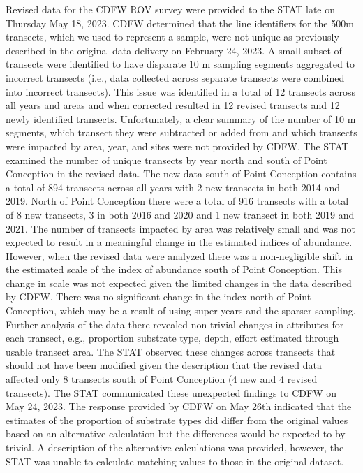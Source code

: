 \documentclass[11pt,
  english,
  letterpaper,
]{article}
\begin{document}
Revised data for the CDFW ROV survey were provided to the STAT late on Thursday May 18, 2023. CDFW determined that the line identifiers for the 500m transects, which we used to represent a sample, were not unique as previously described in the original data delivery on February 24, 2023. A small subset of transects were identified to have disparate 10 m sampling segments aggregated to incorrect transects (i.e., data collected across separate transects were combined into incorrect transects). This issue was identified in a total of 12 transects across all years and areas and when corrected resulted in 12 revised transects and 12 newly identified transects. Unfortunately, a clear summary of the number of 10 m segments, which transect they were subtracted or added from and which transects were impacted by area, year, and sites were not provided by CDFW. The STAT examined the number of unique transects by year north and south of Point Conception in the revised data. The new data south of Point Conception contains a total of 894 transects across all years with 2 new transects in both 2014 and 2019. North of Point Conception there were a total of 916 transects with a total of 8 new transects, 3 in both 2016 and 2020 and 1 new transect in both 2019 and 2021. The number of transects impacted by area was relatively small and was not expected to result in a meaningful change in the estimated indices of abundance. However, when the revised data were analyzed there was a non-negligible shift in the estimated scale of the index of abundance south of Point Conception. This change in scale was not expected given the limited changes in the data described by CDFW. There was no significant change in the index north of Point Conception, which may be a result of using super-years and the sparser sampling. Further analysis of the data there revealed non-trivial changes in attributes for each transect, e.g., proportion substrate type, depth, effort estimated through usable transect area. The STAT observed these changes across transects that should not have been modified given the description that the revised data affected only 8 transects south of Point Conception (4 new and 4 revised transects). The STAT communicated these unexpected findings to CDFW on May 24, 2023. The response provided by CDFW on May 26th indicated that the estimates of the proportion of substrate types did differ from the original values based on an alternative calculation but the differences would be expected to by trivial. A description of the alternative calculations was provided, however, the STAT was unable to calculate matching values to those in the original dataset.
\end{document}
